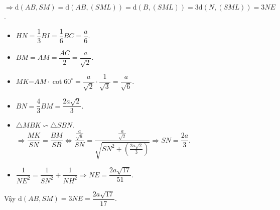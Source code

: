 \begin{ex}
{{\begin{tikzpicture}[scale=1.2, line join=round, line cap=round,font=\footnotesize,>=stealth]
			\end{tikzpicture}}
		$\Rightarrow \mathrm{d}(AB,SM)=\mathrm{d}(AB,(SML))=\mathrm{d}(B,(SML))=3\mathrm{d}(N,(SML))=3NE$.
		\begin{itemize}
			\item $HN=\dfrac{1}{3}BI =\dfrac{1}{6}BC=\dfrac{a}{6}.$
			\item $BM=AM=\dfrac{AC}{2}=\dfrac{a}{\sqrt{2}}.$
			\item $MK$=$AM \cdot \cot 60^{\circ}=\dfrac{a}{\sqrt{2}} \cdot \dfrac{1}{\sqrt{3}}=\dfrac{a}{\sqrt{6}}.$
			\item $BN=\dfrac{4}{3} BM=\dfrac{2a\sqrt{2}}{3}.$
			\item  $\triangle MBK \backsim \triangle SBN$.\\
			$\Rightarrow \dfrac{MK}{SN}=\dfrac{BM}{SB}\Leftrightarrow 
			\dfrac{\frac{a}{\sqrt{6}}}{SN}=\dfrac{\frac{a}{\sqrt{2}}}{\sqrt{SN^2+\left(\frac{2a\sqrt{2}}{3}\right)}}
			\Rightarrow SN=\dfrac{2a}{3}$.
			\item $\dfrac{1}{NE^2}=\dfrac{1}{SN^2}+\dfrac{1}{NH^2}
			\Rightarrow NE=\dfrac{2a\sqrt{17}}{51}$.
		\end{itemize}
		Vậy $\mathrm{d}(AB,SM)=3NE=\dfrac{2a\sqrt{17}}{17}$.
	}
\end{ex}%
